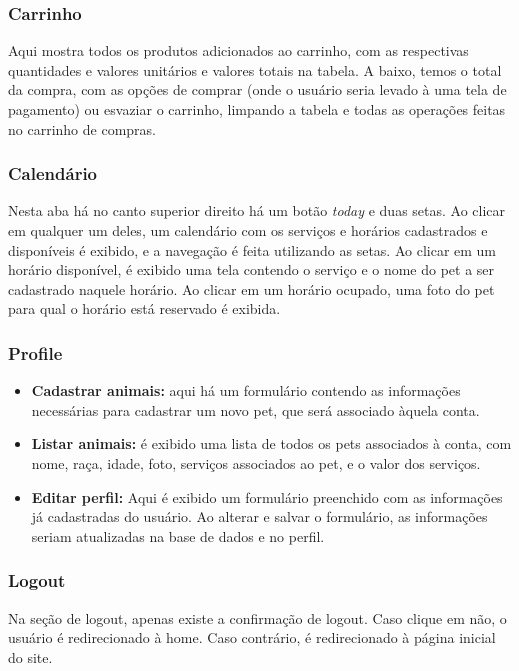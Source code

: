 \documentclass[10pt,a4paper]{article}
\begin{document}
\subsubsection{Carrinho}
Aqui mostra todos os produtos adicionados ao carrinho, com as respectivas quantidades e valores unitários e valores totais na tabela. A baixo, temos o total da compra, com as opções de comprar (onde o usuário seria levado à uma tela de pagamento) ou esvaziar o carrinho, limpando a tabela e todas as operações feitas no carrinho de compras.
\subsubsection{Calendário}
Nesta aba há no canto superior direito há um botão \textit{today} e duas setas. Ao clicar em qualquer um deles, um calendário com os serviços e horários cadastrados e disponíveis é exibido, e a navegação é feita utilizando as setas. Ao clicar em um horário disponível, é exibido uma tela contendo o serviço e o nome do pet a ser cadastrado naquele horário. Ao clicar em um horário ocupado, uma foto do pet para qual o horário está reservado é exibida.
\subsubsection{Profile}
\begin{itemize}
\item \textbf{Cadastrar animais:} aqui há um formulário contendo as informações necessárias para cadastrar um novo pet, que será associado àquela conta.
\item \textbf{Listar animais:} é exibido uma lista de todos os pets associados à conta, com nome, raça, idade, foto, serviços associados ao pet, e o valor dos serviços.
\item \textbf{Editar perfil:} Aqui é exibido um formulário preenchido com as informações já cadastradas do usuário. Ao alterar e salvar o formulário, as informações seriam atualizadas na base de dados e no perfil.
\end{itemize}
\subsubsection{Logout}
Na seção de logout, apenas existe a confirmação de logout. Caso clique em não, o usuário é redirecionado à home. Caso contrário, é redirecionado à página inicial do site.
\end{document}
